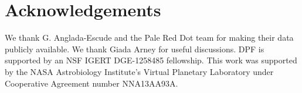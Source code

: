 \documentclass[apjl]{emulateapj}
\begin{document}
\section{Acknowledgements}
\label{sec:ack}

We thank G. Anglada-Escude and the Pale Red Dot team for making their data publicly available. We thank Giada Arney for useful discussions. DPF is supported by an NSF IGERT DGE-1258485 fellowship. This work was supported by the NASA Astrobiology Institute’s Virtual Planetary Laboratory under Cooperative Agreement number NNA13AA93A.



\end{document}
